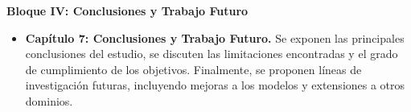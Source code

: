 \textbf{Bloque IV: Conclusiones y Trabajo Futuro}
\begin{itemize}
    \item \textbf{Capítulo 7: Conclusiones y Trabajo Futuro.} Se exponen las principales conclusiones del estudio, se discuten las limitaciones encontradas y el grado de cumplimiento de los objetivos. Finalmente, se proponen líneas de investigación futuras, incluyendo mejoras a los modelos y extensiones a otros dominios.
\end{itemize}
